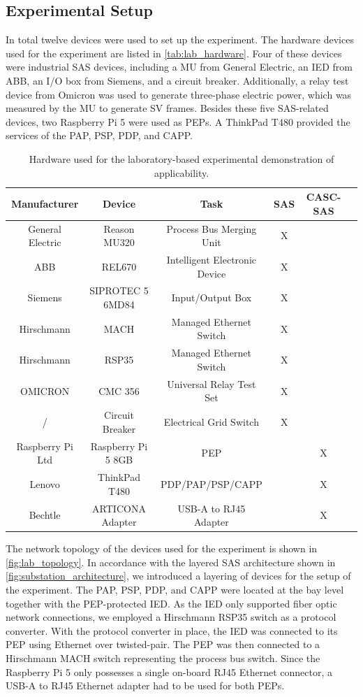 \subsection{Experimental Setup}
\label{sec:evaluation:compatibility:setup}
In total twelve devices were used to set up the experiment.
The hardware devices used for the experiment are listed in \autoref{tab:lab_hardware}.
Four of these devices were industrial SAS devices, including a MU from General Electric, an IED from ABB, an I/O box from Siemens, and a circuit breaker.
Additionally, a relay test device from Omicron was used to generate three-phase electric power, which was measured by the MU to generate SV frames.
Besides these five SAS-related devices, two Raspberry Pi 5 were used as PEPs.
A ThinkPad T480 provided the services of the PAP, PSP, PDP, and CAPP.
\begin{table}
    \centering
    \small
    \caption{Hardware used for the laboratory-based experimental demonstration of applicability.}
    \label{tab:lab_hardware}
    \begin{tabular}{c c c c c c}
    \toprule
    Manufacturer & Device & Task & SAS & CASC-SAS\\
    \midrule
    General Electric & Reason MU320 & Process Bus Merging Unit & X & \\
    ABB & REL670 & Intelligent Electronic Device & X & \\
    Siemens & SIPROTEC 5 6MD84 & Input/Output Box & X & \\
    Hirschmann & MACH & Managed Ethernet Switch & X & \\
    Hirschmann & RSP35 & Managed Ethernet Switch & X & \\
    OMICRON & CMC 356 & Universal Relay Test Set & X & \\
    / & Circuit Breaker & Electrical Grid Switch & X & \\
    Raspberry Pi Ltd & Raspberry Pi 5 8GB & PEP & & X \\
    Lenovo & ThinkPad T480 & PDP/PAP/PSP/CAPP & & X \\
    Bechtle & ARTICONA Adapter & USB-A to RJ45 Adapter & & X \\
    \bottomrule
    \end{tabular}
\end{table}

The network topology of the devices used for the experiment is shown in \autoref{fig:lab_topology}.
In accordance with the layered SAS architecture shown in \autoref{fig:substation_architecture}, we introduced a layering of devices for the setup of the experiment.
The PAP, PSP, PDP, and CAPP were located at the bay level together with the PEP-protected IED.
As the IED only supported fiber optic network connections, we employed a Hirschmann RSP35 switch as a protocol converter.
With the protocol converter in place, the IED was connected to its PEP using Ethernet over twisted-pair.
The PEP was then connected to a Hirschmann MACH switch representing the process bus switch.
Since the Raspberry Pi 5 only possesses a single on-board RJ45 Ethernet connector, a USB-A to RJ45 Ethernet adapter had to be used for both PEPs.

